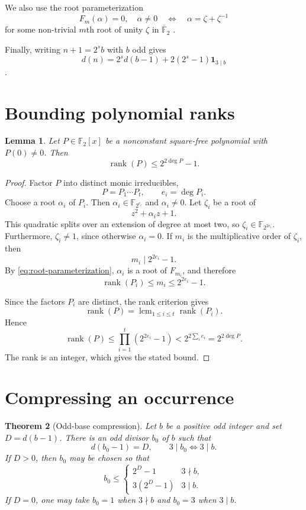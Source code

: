 \documentclass[a4paper]{article}
\newtheorem{theorem}{Theorem}[section]
\newtheorem{lemma}[theorem]{Lemma}
\newcommand{\F}{\mathbb{F}}
\DeclareMathOperator{\rank}{rank}
\begin{document}
We also use the root parameterization
\begin{equation}\label{eq:root-parameterization}
	F_m(\alpha)=0,\quad \alpha\neq0
	\quad\Longleftrightarrow\quad
	\alpha=\zeta+\zeta^{-1}
\end{equation}
for some non-trivial $m$th root of unity $\zeta$ in
$\overline{\F}_2$ \cite{HUNZIKER2004465}.

Finally, writing $n+1=2^s b$ with $b$ odd gives
\begin{equation}\label{eq:two-adic}
	d(n)
	=
	2^s d(b-1)
	+2(2^s-1)\mathbf{1}_{3\mid b}
\end{equation}
\cite{boylesResolutionSutner}.

\section{Bounding polynomial ranks}

\begin{lemma}\label{lem:rank-bound}
	Let $P\in\F_2[x]$ be a nonconstant square-free polynomial with
	$P(0)\neq0$.
	Then
	\[
		\rank(P)\leq2^{2\deg P}-1.
	\]
\end{lemma}

\begin{proof}
	Factor $P$ into distinct monic irreducibles,
	\[
		P=P_1\cdots P_t,
		\qquad
		e_i=\deg P_i.
	\]
	Choose a root $\alpha_i$ of $P_i$.
	Then $\alpha_i\in\F_{2^{e_i}}$ and $\alpha_i\neq0$.
	Let $\zeta_i$ be a root of
	\[
		z^2+\alpha_i z+1.
	\]
	This quadratic splits over an extension of degree at most two, so
	$\zeta_i\in\F_{2^{2e_i}}$.
	Furthermore, $\zeta_i\neq1$, since otherwise $\alpha_i=0$.
	If $m_i$ is the multiplicative order of $\zeta_i$, then
	\[
		m_i\mid 2^{2e_i}-1.
	\]
	By \eqref{eq:root-parameterization}, $\alpha_i$ is a root of
	$F_{m_i}$, and therefore
	\[
		\rank(P_i)\leq m_i\leq2^{2e_i}-1.
	\]

	Since the factors $P_i$ are distinct, the rank criterion gives
	\[
		\rank(P)
		=
		\mathop{\operatorname{lcm}}_{1\leq i\leq t}\rank(P_i).
	\]
	Hence
	\[
		\rank(P)
		\leq
		\prod_{i=1}^t(2^{2e_i}-1)
		<
		2^{2\sum_i e_i}
		=
		2^{2\deg P}.
	\]
	The rank is an integer, which gives the stated bound.
\end{proof}

\section{Compressing an occurrence}

\begin{theorem}[Odd-base compression]\label{thm:compression}
	Let $b$ be a positive odd integer and set $D=d(b-1)$.
	There is an odd divisor $b_0$ of $b$ such that
	\[
		d(b_0-1)=D,
		\qquad
		3\mid b_0\Longleftrightarrow3\mid b.
	\]
	If $D>0$, then $b_0$ may be chosen so that
	\[
		b_0\leq
		\begin{cases}
			2^D-1 & 3\nmid b,\\
			3(2^D-1) & 3\mid b.
		\end{cases}
	\]
	If $D=0$, one may take $b_0=1$ when $3\nmid b$ and $b_0=3$
	when $3\mid b$.
\end{theorem}
\end{document}
